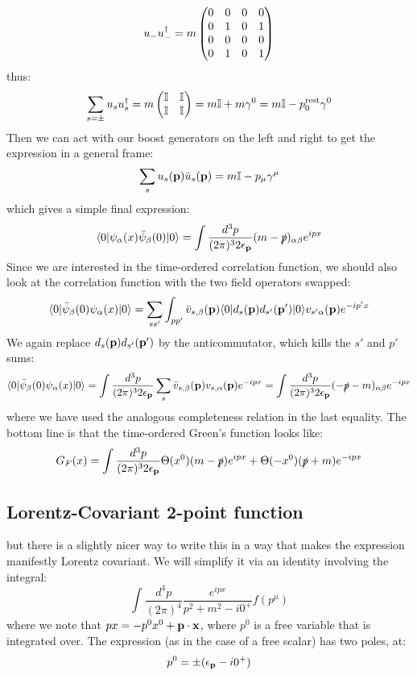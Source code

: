 \begin{equation}
    u_-u_-^\dagger = m\begin{pmatrix}0 & 0 & 0 & 0 \\ 0 & 1 & 0 & 1 \\ 0 & 0 & 0 & 0 \\ 0 & 1 & 0 & 1\end{pmatrix}
\end{equation}
thus:
\begin{equation}
    \sum_{s=\pm}u_s u_s^\dagger = m\begin{pmatrix}\mathbb{I} & \mathbb{I} \\ \mathbb{I} & \mathbb{I}\end{pmatrix} = m\mathbb{I} + m\gamma^0 = m\mathbb{I} - p_0^{\text{rest}}\gamma^0
\end{equation} 
Then we can act with our boost generators on the left and right to get the expression in a general frame:
\begin{equation}
    \sum_s u_s(\mathbf{p})\bar{u}_s(\mathbf{p}) = m\mathbb{I} - p_\mu \gamma^\mu
\end{equation}
which gives a simple final expression:
\begin{equation}
    \langle 0 \rvert\psi_\alpha(x)\bar{\psi}_\beta(0)\lvert 0 \rangle = \int \frac{d^3p}{(2\pi)^32\epsilon_{\mathbf{p}}}(m - \slashed{p})_{\alpha\beta} e^{ipx}
\end{equation}
Since we are interested in the time-ordered correlation function, we should also look at the correlation function with the two field operators swapped:
\begin{equation}
    \langle 0 \rvert\bar{\psi}_\beta(0)\psi_\alpha(x)\lvert 0 \rangle = \sum_{ss'}\int_{pp'}\bar{v}_{s, \beta}(\mathbf{p})\langle 0 \rvert d_s(\mathbf{p})d_{s'}(\mathbf{p}')\lvert 0 \rangle v_{s'\alpha}(\mathbf{p})e^{-ip'x}
\end{equation}
We again replace $d_s(\mathbf{p})d_{s'}(\mathbf{p}')$ by the anticommutator, which kills the $s'$ and $p'$ sums:
\begin{equation}
    \langle 0 \rvert\bar{\psi}_\beta(0)\psi_\alpha(x)\lvert 0 \rangle = \int \frac{d^3p}{(2\pi)^32\epsilon_{\mathbf{p}}}\sum_s \bar{v}_{s, \beta}(\mathbf{p})v_{s, \alpha}(\mathbf{p})e^{-ipx} = \int \frac{d^3p}{(2\pi)^32\epsilon_{\mathbf{p}}}(-\slashed{p}-m)_{\alpha\beta}e^{-ipx}
\end{equation}
where we have used the analogous completeness relation in the last equality. The bottom line is that the time-ordered Green's function looks like:
\begin{equation}
    G_F(x) = \int \frac{d^3p}{(2\pi)^32\epsilon_{\mathbf{p}}}\Theta(x^0)(m-\slashed{p})e^{ipx} + \Theta(-x^0)(\slashed{p} + m)e^{-ipx}
\end{equation}


\subsection{Lorentz-Covariant 2-point function}
but there is a slightly nicer way to write this in a way that makes the expression manifestly Lorentz covariant. We will simplify it via an identity involving the integral:
\begin{equation}
    \int \frac{d^4p}{(2\pi)^4}\frac{e^{ipx}}{p^2 + m^2 - i0^+}f(p^\mu)
\end{equation}
where we note that $px = -p^0x^0 + \mathbf{p}\cdot\mathbf{x}$, where $p^0$ is a free variable that is integrated over. The expression (as in the case of a free scalar) has two poles, at:
\begin{equation}
    p^0 = \pm(\epsilon_{\mathbf{p}} - i0^+)
\end{equation}

